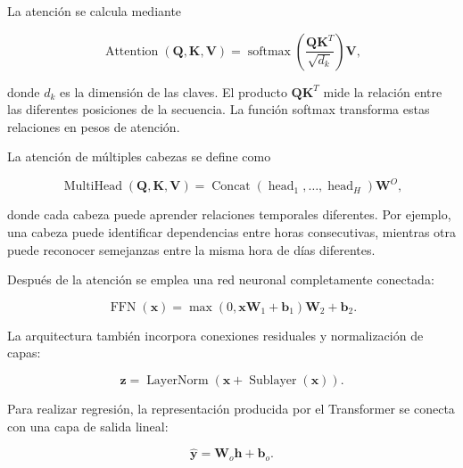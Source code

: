 La atención se calcula mediante

\begin{equation}
    \operatorname{Attention}
    \left(
        \mathbf{Q},
        \mathbf{K},
        \mathbf{V}
    \right)
    =
    \operatorname{softmax}
    \left(
        \frac{
            \mathbf{Q}\mathbf{K}^{T}
        }{
            \sqrt{d_k}
        }
    \right)
    \mathbf{V},
\end{equation}

donde $d_k$ es la dimensión de las claves. El producto $\mathbf{Q}\mathbf{K}^{T}$ mide la relación entre las diferentes posiciones de la secuencia. La función softmax transforma estas relaciones en pesos de atención.

La atención de múltiples cabezas se define como

\begin{equation}
    \operatorname{MultiHead}
    \left(
        \mathbf{Q},
        \mathbf{K},
        \mathbf{V}
    \right)
    =
    \operatorname{Concat}
    \left(
        \operatorname{head}_1,
        \ldots,
        \operatorname{head}_H
    \right)
    \mathbf{W}^{O},
\end{equation}

donde cada cabeza puede aprender relaciones temporales diferentes. Por ejemplo, una cabeza puede identificar dependencias entre horas consecutivas, mientras otra puede reconocer semejanzas entre la misma hora de días diferentes.

Después de la atención se emplea una red neuronal completamente conectada:

\begin{equation}
    \operatorname{FFN}(\mathbf{x})
    =
    \max
    \left(
        0,
        \mathbf{x}\mathbf{W}_1+\mathbf{b}_1
    \right)
    \mathbf{W}_2
    +
    \mathbf{b}_2.
\end{equation}

La arquitectura también incorpora conexiones residuales y normalización de capas:

\begin{equation}
    \mathbf{z}
    =
    \operatorname{LayerNorm}
    \left(
        \mathbf{x}
        +
        \operatorname{Sublayer}(\mathbf{x})
    \right).
\end{equation}

Para realizar regresión, la representación producida por el Transformer se conecta con una capa de salida lineal:

\begin{equation}
    \hat{\mathbf{y}}
    =
    \mathbf{W}_{o}\mathbf{h}
    +
    \mathbf{b}_{o}.
\end{equation}

